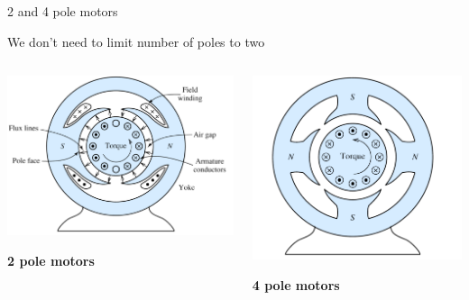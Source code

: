 \documentclass[compress]{beamer}
\begin{document}
\begin{frame}{2 and 4 pole motors}

    We don't need to limit number of poles to two

    \begin{columns}
        \begin{column}{0.5\linewidth}
            \begin{center}
                \includegraphics[height=0.5\paperheight]{image48}

                \textbf{2 pole motors}
            \end{center}
        \end{column}
        \begin{column}{0.5\linewidth}

            \begin{center}
                \includegraphics[height=0.5\paperheight]{image49}

                \textbf{4 pole motors}
            \end{center}
        \end{column}
    \end{columns}


\end{frame}
\end{document}
